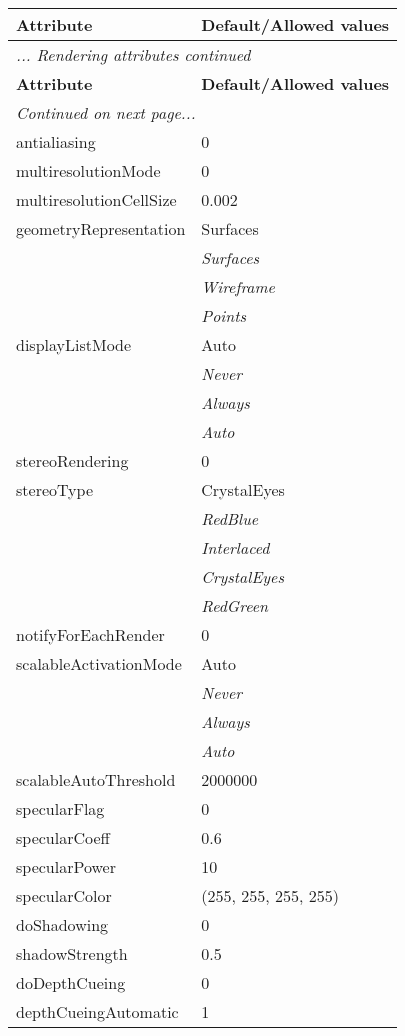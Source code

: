 \documentclass[10pt,a4paper]{report}
\begin{document}
\begin{longtable}{ll}
{\bf Attribute} & {\bf Default/Allowed values} \\
\hline \hline
\endfirsthead
\multicolumn{2}{l}{{\it ... Rendering attributes continued}} \\
{\bf Attribute} & {\bf Default/Allowed values} \\
\hline \hline
\endhead
\hline
\multicolumn{2}{l}{{\it Continued on next page...}} \\
\endfoot
\hline
\endlastfoot

antialiasing  &  0 \\
multiresolutionMode  &  0 \\
multiresolutionCellSize  &  0.002 \\
geometryRepresentation  &  Surfaces   \\
 & {\it  Surfaces} \\
 & {\it  Wireframe} \\
 & {\it  Points} \\
displayListMode  &  Auto   \\
 & {\it  Never} \\
 & {\it  Always} \\
 & {\it  Auto} \\
stereoRendering  &  0 \\
stereoType  &  CrystalEyes   \\
 & {\it  RedBlue} \\
 & {\it  Interlaced} \\
 & {\it  CrystalEyes} \\
 & {\it  RedGreen} \\
notifyForEachRender  &  0 \\
scalableActivationMode  &  Auto   \\
 & {\it  Never} \\
 & {\it  Always} \\
 & {\it  Auto} \\
scalableAutoThreshold  &  2000000 \\
specularFlag  &  0 \\
specularCoeff  &  0.6 \\
specularPower  &  10 \\
specularColor  &  (255, 255, 255, 255) \\
doShadowing  &  0 \\
shadowStrength  &  0.5 \\
doDepthCueing  &  0 \\
depthCueingAutomatic  &  1 \\

\end{longtable}
\end{document}
